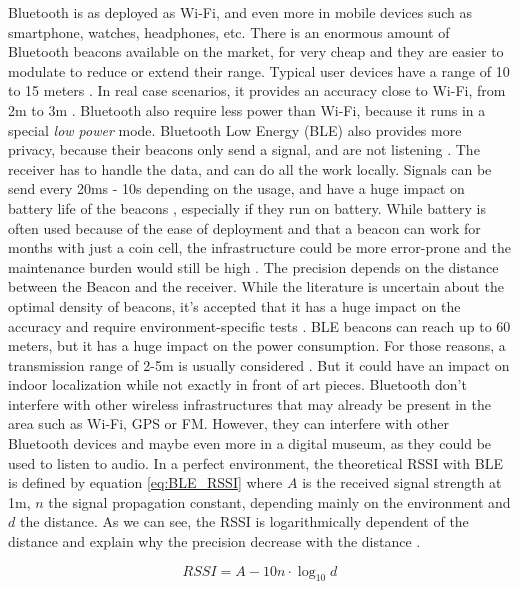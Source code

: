Bluetooth is as deployed as Wi-Fi, and even more in mobile devices such as smartphone, watches, headphones, etc. There is an enormous amount of Bluetooth beacons available on the market, for very cheap \cite{spachos_ble_2020} and they are easier to modulate to reduce or extend their range. Typical user devices have a range of 10 to 15 meters \cite{mainetti_survey_2014}. In real case scenarios, it provides an accuracy close to Wi-Fi, from 2m to 3m \cite{mainetti_survey_2014} \cite{spachos_ble_2020}. Bluetooth also require less power than Wi-Fi, because it runs in a special \textit{low power} mode. Bluetooth Low Energy (BLE) also provides more privacy, because their beacons only send a signal, and are not listening \cite{spachos_ble_2020}. The receiver has to handle the data, and can do all the work locally. Signals can be send every 20ms - 10s depending on the usage, and have a huge impact on battery life of the beacons \cite{spachos_ble_2020}, especially if they run on battery. While battery is often used because of the ease of deployment and that a beacon can work for months with just a coin cell, the infrastructure could be more error-prone and the maintenance burden would still be high \cite{spachos_ble_2020}. The precision depends on the distance between the Beacon and the receiver. While the literature is uncertain about the optimal density of beacons, it's accepted that it has a huge impact on the accuracy and require environment-specific tests \cite{spachos_ble_2020} \cite{shang_overview_2022}. BLE beacons can reach up to 60 meters, but it has a huge impact on the power consumption. For those reasons, a transmission range of 2-5m is usually considered \cite{spachos_ble_2020}. But it could have an impact on indoor localization while not exactly in front of art pieces. Bluetooth don't interfere with other wireless infrastructures that may already be present in the area such as Wi-Fi, GPS or FM. However, they can interfere with other Bluetooth devices \cite{spachos_ble_2020}  and maybe even more in a digital museum, as they could be used to listen to audio. In a perfect environment, the theoretical RSSI with BLE is defined by equation \ref{eq:BLE_RSSI} where $A$ is the received signal strength at 1m, $n$ the signal propagation constant, depending mainly on the environment and $d$ the distance. As we can see, the RSSI is logarithmically dependent of the distance and explain why the precision decrease with the distance \cite{spachos_ble_2020}.

\begin{equation} \label{eq:BLE_RSSI}
    RSSI = A - 10n \cdot \log_{10}d
\end{equation}

